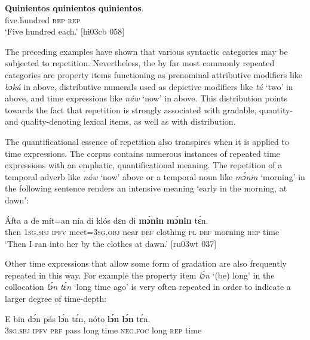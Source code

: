 \ea%
    \label{ex:key:150}
    \gll \textbf{Quinientos}  \textbf{quinientos}  \textbf{quinientos}.\\
five.hundred  \textsc{rep}      \textsc{rep}\\

\glt ‘Five hundred each.’ [hi03cb 058]
\z

The preceding examples have shown that various syntactic categories may be subjected to repetition. Nevertheless, the by far most commonly repeated categories are property items functioning as prenominal attributive modifiers like \textit{bɔkú} in  above, distributive numerals used as depictive modifiers like \textit{tú} ‘two’ in  above, and time expressions like \textit{náw} ‘now’ in  above. This distribution points towards the fact that repetition is strongly associated with gradable, quantity- and quality-denoting lexical items, as well as with distribution. 


The quantificational essence of repetition also transpires when it is applied to time expressions. The corpus contains numerous instances of repeated time expressions with an emphatic, quantificational meaning. The repetition of a temporal adverb like \textit{náw} ‘now’  above or a temporal noun like \textit{mɔ́nin} ‘morning’ in the following sentence renders an intensive meaning ‘early in the morning, at dawn’: 



\ea%
    \label{ex:key:151}
    \gll \'{A}fta    a    de  mít=an    nía    di  klós    dɛn
di  \textbf{mɔ́nin}  \textbf{mɔ́nin}  tɛ́n.\\
then  \textsc{1sg.sbj}  \textsc{ipfv}  meet=\textsc{3sg.obj}  near    \textsc{def}  clothing  \textsc{pl}
\textsc{def}  morning  \textsc{rep}    time\\

\glt ‘Then I ran into her by the clothes at dawn.’ [ru03wt 037]
\z

Other time expressions that allow some form of gradation are also frequently repeated in this way. For example the property item \textit{lɔ́n} ‘(be) long’ in the collocation \textit{lɔ́n tɛ́n} ‘long time ago’ is very often repeated in order to indicate a larger degree of time-depth: 


\ea%
    \label{ex:key:152}
    \gll E    bin  dɔ́n  pás  lɔ́n    tɛ́n,    nóto  \textbf{lɔ́n}    \textbf{lɔ́n}  tɛ́n.\\
\textsc{3sg.sbj}  \textsc{ipfv}  \textsc{prf}  pass  long    time    \textsc{neg}.\textsc{foc}  long    \textsc{rep}  time\\


